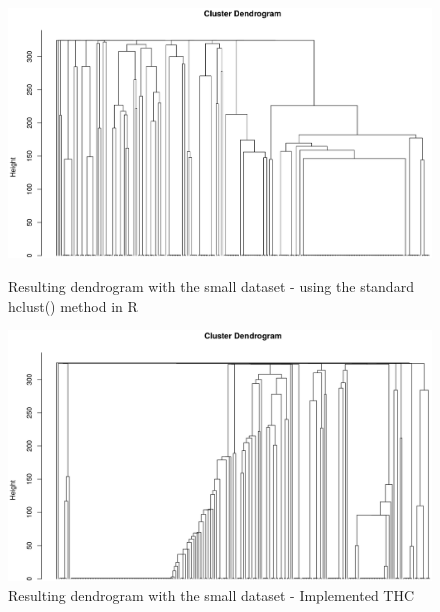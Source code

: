\documentclass[a4paper,10pt]{article}
\theoremstyle{plain}
\theoremstyle{definition}
\begin{document}
\begin{figure}[H]
	\centering
	\begin{minipage}{0.75\textwidth}
		\includegraphics[width=1\textwidth]{./pictures/dendrogramHclustStandard.png}
		\caption{Resulting dendrogram with the small dataset - using the standard hclust() method in R}
		\label{fig:dendrogramHclustStandard}
	\end{minipage}
	\begin{minipage}{0.75\textwidth}
		\includegraphics[width=1\textwidth]{./pictures/dendrogramHcImplemented.png}
		\caption{Resulting dendrogram with the small dataset - Implemented THC}
		\label{fig:dendrogramHcImplemented}
	\end{minipage}
\end{figure}
\end{document}
